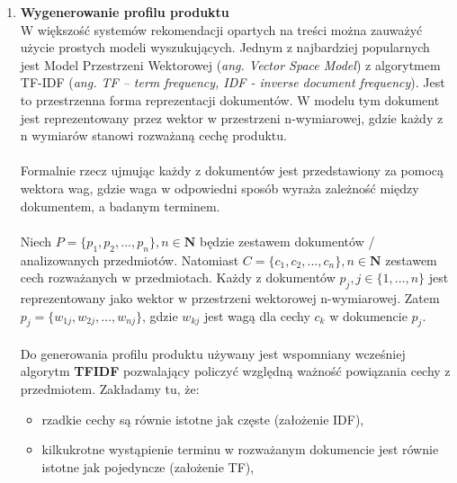 \documentclass[12pt,a4paper]{report}
\begin{document}
\begin{enumerate}
\item \textbf{Wygenerowanie profilu produktu}
\\
W większość systemów rekomendacji opartych na treści można zauważyć użycie prostych modeli wyszukujących. Jednym z najbardziej popularnych jest Model Przestrzeni Wektorowej (\textit{ang. Vector Space Model}) z algorytmem TF-IDF (\textit{ang. TF – term frequency, IDF - inverse document frequency}). Jest to przestrzenna forma reprezentacji dokumentów. W modelu tym dokument jest reprezentowany przez wektor w przestrzeni n-wymiarowej, gdzie każdy z n wymiarów stanowi rozważaną cechę produktu.
\\
\\Formalnie rzecz ujmując każdy z dokumentów jest przedstawiony za pomocą wektora wag, gdzie waga w odpowiedni sposób wyraża zależność między dokumentem, a badanym terminem.
\\
\\Niech \begin{math} P = \{p_1, p_2,...,p_n\}, n\in{\mathbf{N}} \end{math} będzie zestawem dokumentów / analizowanych przedmiotów. Natomiast \begin{math}C = \{c_1, c_2,...,c_n\}, n\in{\mathbf{N}} \end{math} zestawem cech rozważanych w przedmiotach. Każdy z dokumentów \begin{math} p_j, j\in{\{1,...,n\}} \end{math} jest reprezentowany jako wektor w przestrzeni wektorowej n-wymiarowej. Zatem \begin{math} p_j = \{w_{1j}, w_{2j},...,w_{nj}\} \end{math}, gdzie \begin{math} w_{kj} \end{math}  jest wagą dla cechy \begin{math} c_k \end{math} w dokumencie  \begin{math} p_j \end{math}.
\\
\\
Do generowania profilu produktu używany jest wspomniany wcześniej algorytm \textbf{ TFIDF } pozwalający policzyć względną ważność powiązania cechy z przedmiotem. Zakładamy tu, że:
\begin{itemize}
\item rzadkie cechy są równie istotne jak częste (założenie IDF),
\item kilkukrotne wystąpienie terminu w rozważanym dokumencie jest równie istotne jak pojedyncze (założenie TF),

\end{itemize}
\end{enumerate}
\end{document}
